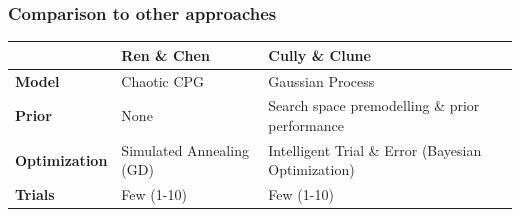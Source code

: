 \documentclass{beamer}
\begin{document}
\begin{frame}
\frametitle{Comparison to other approaches}
    \hspace*{-0.7cm}
  \centering
  \begin{tabular}{p{2cm}p{4.2cm}p{4.2cm}}
     & \textbf{Ren \& Chen} & \textbf{Cully \& Clune} \\
     \hline
    \textbf{Model} & Chaotic CPG & Gaussian Process \\
    \hline
    \textbf{Prior} & None & Search space \newline premodelling \& \newline  prior performance\\
    \hline
    \textbf{Optimization} & Simulated Annealing (GD) & Intelligent Trial \& Error \newline (Bayesian Optimization) \\
    \hline
    \textbf{Trials} & Few (1-10) & Few (1-10)
  \end{tabular}
\end{frame}
\end{document}
